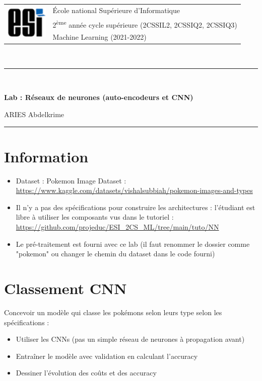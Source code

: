 \documentclass[11pt, a4paper]{article}
\begin{document}

\noindent
\begin{tabular}{ll}
\multirow{3}{*}{\includegraphics[width=2cm]{../img/esi-logo.png}} & \'Ecole national Supérieure d'Informatique\\
& 2\textsuperscript{ème} année cycle supérieure (2CSSIL2, 2CSSIQ2, 2CSSIQ3)\\
& Machine Learning (2021-2022)
\end{tabular}\\[.25cm]
\noindent\rule{\textwidth}{1pt}\\%
\begin{center}
{\LARGE \textbf{Lab : Réseaux de neurones (auto-encodeurs et CNN)}}
\begin{flushright}
	ARIES Abdelkrime
\end{flushright}
\end{center}
\noindent\rule{\textwidth}{1pt}

\section*{Information}

\begin{itemize}
	\item Dataset : Pokemon Image Dataset : {\scriptsize\url{https://www.kaggle.com/datasets/vishalsubbiah/pokemon-images-and-types}}
	\item Il n'y a pas des spécifications pour construire les architectures : l'étudiant est libre à utiliser les composants vus dans le tutoriel : {\scriptsize \url{https://github.com/projeduc/ESI_2CS_ML/tree/main/tuto/NN}}
	\item Le pré-traitement est fourni avec ce lab (il faut renommer le dossier comme "pokemon" ou changer le chemin du dataset dans le code fourni)
\end{itemize}

\section*{Classement CNN}

Concevoir un modèle qui classe les pokémons selon leurs type selon les spécifications : 
\begin{itemize}
	\item Utiliser les CNNs (pas un simple réseau de neurones à propagation avant)
	\item Entraîner le modèle avec validation en calculant l'accuracy
	\item Dessiner l'évolution des coûts et des accuracy
\end{itemize}
\end{document}
